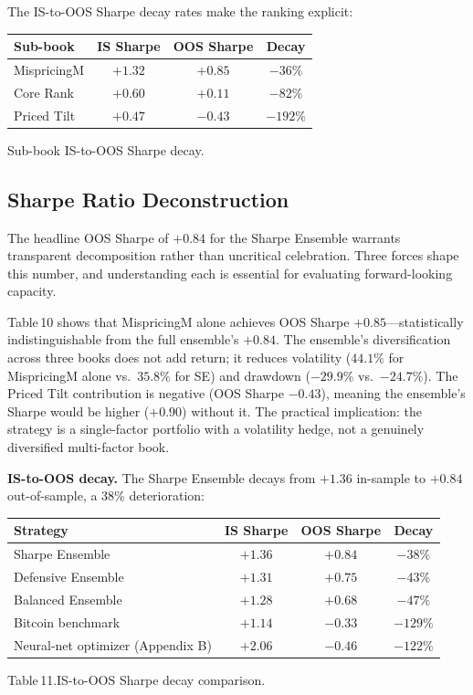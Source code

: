 \documentclass[11pt,a4paper]{article}
\begin{document}
The IS-to-OOS Sharpe decay rates make the ranking explicit:

\begin{center}
\small
\begin{tabular}{lccc}
\toprule
\rowcolor{tablehead}
\textbf{Sub-book} & \textbf{IS Sharpe} & \textbf{OOS Sharpe} & \textbf{Decay} \\
\midrule
MispricingM  & $+1.32$ & $+0.85$ & $-36\%$ \\
Core Rank    & $+0.60$ & $+0.11$ & $-82\%$ \\
Priced Tilt  & $+0.47$ & $-0.43$ & $-192\%$ \\
\bottomrule
\end{tabular}
\end{center}
\smallskip
{\small Sub-book IS-to-OOS Sharpe decay.}

\subsection{Sharpe Ratio Deconstruction}

The headline OOS Sharpe of $+0.84$ for the Sharpe Ensemble warrants transparent decomposition rather than uncritical celebration. Three forces shape this number, and understanding each is essential for evaluating forward-looking capacity.

\begin{callout}[title=Alpha source concentration]
Table\,10 shows that MispricingM alone achieves OOS Sharpe $+0.85$---statistically indistinguishable from the full ensemble's $+0.84$. The ensemble's diversification across three books does not add return; it reduces volatility ($44.1\%$ for MispricingM alone vs.\ $35.8\%$ for SE) and drawdown ($-29.9\%$ vs.\ $-24.7\%$). The Priced Tilt contribution is negative (OOS Sharpe $-0.43$), meaning the ensemble's Sharpe would be higher ($+0.90$) without it. The practical implication: the strategy is a single-factor portfolio with a volatility hedge, not a genuinely diversified multi-factor book.
\end{callout}

\textbf{IS-to-OOS decay.}\;
The Sharpe Ensemble decays from $+1.36$ in-sample to $+0.84$ out-of-sample, a 38\% deterioration:

\begin{center}
\small
\begin{tabular}{lccc}
\toprule
\rowcolor{tablehead}
\textbf{Strategy} & \textbf{IS Sharpe} & \textbf{OOS Sharpe} & \textbf{Decay} \\
\midrule
Sharpe Ensemble              & $+1.36$ & $+0.84$ & $-38\%$ \\
Defensive Ensemble            & $+1.31$ & $+0.75$ & $-43\%$ \\
Balanced Ensemble             & $+1.28$ & $+0.68$ & $-47\%$ \\
Bitcoin benchmark             & $+1.14$ & $-0.33$ & $-129\%$ \\
Neural-net optimizer (Appendix B) & $+2.06$ & $-0.46$ & $-122\%$ \\
\bottomrule
\end{tabular}
\end{center}
\smallskip
{\small Table\,11.\;IS-to-OOS Sharpe decay comparison.}
\end{document}
